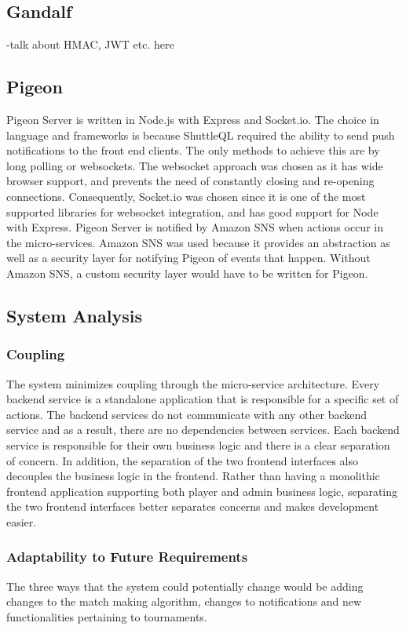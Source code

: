 \documentclass{article}
\begin{document}
\subsection{Gandalf}
-talk about HMAC, JWT etc. here

\subsection{Pigeon}
Pigeon Server is written in Node.js with Express and Socket.io. The choice in language and frameworks is because ShuttleQL required the ability to send push notifications to the front end clients. The only methods to achieve this are by long polling or websockets. The websocket approach was chosen as it has wide browser support, and prevents the need of constantly closing and re-opening connections. Consequently, Socket.io was chosen since it is one of the most supported libraries for websocket integration, and has good support for Node with Express. Pigeon Server is notified by Amazon SNS when actions occur in the micro-services. Amazon SNS was used because it provides an abstraction as well as a security layer for notifying Pigeon of events that happen. Without Amazon SNS, a custom security layer would have to be written for Pigeon.

\subsection{System Analysis}

\subsubsection{Coupling}
The system minimizes coupling through the micro-service architecture. Every backend service is a standalone application that is responsible for a specific set of actions. The backend services do not communicate with any other backend service and as a result, there are no dependencies between services. Each backend service is responsible for their own business logic and there is a clear separation of concern. In addition, the separation of the two frontend interfaces also decouples the business logic in the frontend. Rather than having a monolithic frontend application supporting both player and admin business logic, separating the two frontend interfaces better separates concerns and makes development easier.

\subsubsection{Adaptability to Future Requirements}
The three ways that the system could potentially change would be adding changes to the match making algorithm, changes to notifications and new functionalities pertaining to tournaments.
\end{document}
